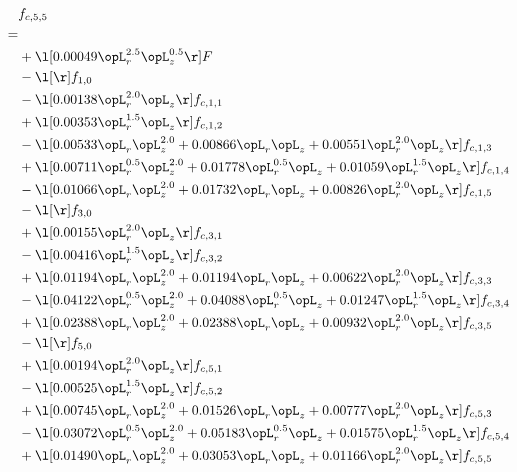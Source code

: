\begin{alignat}{2} 
\label{eq:f_55_1} 
& f_{c,5,5} \nonumber \\ 
 = \\ 
& + \l[  0.00049 \opL_r^{2.5} \opL_z^{0.5}  \r] F \nonumber \\ 
& - \l[  \r] f_{1,0} \nonumber \\ 
& - \l[  0.00138 \opL_r^{2.0} \opL_z  \r] f_{c,1,1} \nonumber \\ 
& + \l[  0.00353 \opL_r^{1.5} \opL_z  \r] f_{c,1,2} \nonumber \\ 
& - \l[  0.00533 \opL_r \opL_z^{2.0} +  0.00866 \opL_r \opL_z +  0.00551 \opL_r^{2.0} \opL_z  \r] f_{c,1,3} \nonumber \\ 
& + \l[  0.00711 \opL_r^{0.5} \opL_z^{2.0} +  0.01778 \opL_r^{0.5} \opL_z +  0.01059 \opL_r^{1.5} \opL_z  \r] f_{c,1,4} \nonumber \\ 
& - \l[  0.01066 \opL_r \opL_z^{2.0} +  0.01732 \opL_r \opL_z +  0.00826 \opL_r^{2.0} \opL_z  \r] f_{c,1,5} \nonumber \\ 
& - \l[  \r] f_{3,0} \nonumber \\ 
& + \l[  0.00155 \opL_r^{2.0} \opL_z  \r] f_{c,3,1} \nonumber \\ 
& - \l[  0.00416 \opL_r^{1.5} \opL_z  \r] f_{c,3,2} \nonumber \\ 
& + \l[  0.01194 \opL_r \opL_z^{2.0} +  0.01194 \opL_r \opL_z +  0.00622 \opL_r^{2.0} \opL_z  \r] f_{c,3,3} \nonumber \\ 
& - \l[  0.04122 \opL_r^{0.5} \opL_z^{2.0} +  0.04088 \opL_r^{0.5} \opL_z +  0.01247 \opL_r^{1.5} \opL_z  \r] f_{c,3,4} \nonumber \\ 
& + \l[  0.02388 \opL_r \opL_z^{2.0} +  0.02388 \opL_r \opL_z +  0.00932 \opL_r^{2.0} \opL_z  \r] f_{c,3,5} \nonumber \\ 
& - \l[  \r] f_{5,0} \nonumber \\ 
& + \l[  0.00194 \opL_r^{2.0} \opL_z  \r] f_{c,5,1} \nonumber \\ 
& - \l[  0.00525 \opL_r^{1.5} \opL_z  \r] f_{c,5,2} \nonumber \\ 
& + \l[  0.00745 \opL_r \opL_z^{2.0} +  0.01526 \opL_r \opL_z +  0.00777 \opL_r^{2.0} \opL_z  \r] f_{c,5,3} \nonumber \\ 
& - \l[  0.03072 \opL_r^{0.5} \opL_z^{2.0} +  0.05183 \opL_r^{0.5} \opL_z +  0.01575 \opL_r^{1.5} \opL_z  \r] f_{c,5,4} \nonumber \\ 
& + \l[  0.01490 \opL_r \opL_z^{2.0} +  0.03053 \opL_r \opL_z +  0.01166 \opL_r^{2.0} \opL_z  \r] f_{c,5,5} \nonumber \\ 

\end{alignat}
